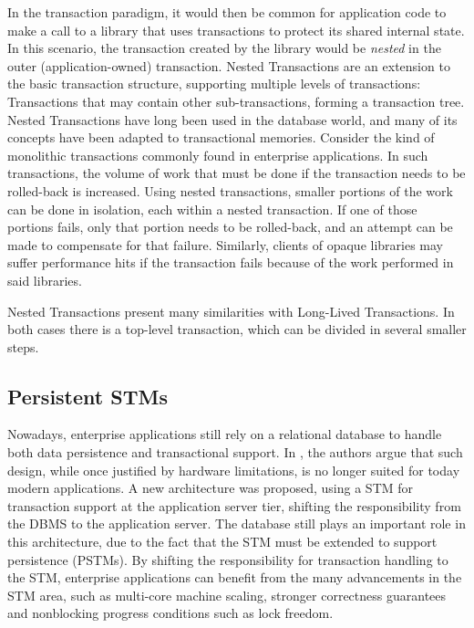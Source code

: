 \documentclass{llncs}
\begin{document}
In the transaction paradigm, it would then be common for application
code to make a call to a library that uses transactions to protect its
shared internal state. In this scenario, the transaction created by
the library would be {\it nested} in the outer (application-owned)
transaction. Nested Transactions are an extension to the basic
transaction structure, supporting multiple levels of transactions:
Transactions that may contain other sub-transactions, forming a
transaction tree. Nested Transactions have long been used in the
database world, and many of its concepts have been adapted to
transactional memories. Consider the kind of monolithic transactions
commonly found in enterprise applications. In such transactions, the
volume of work that must be done if the transaction needs to be
rolled-back is increased. Using nested transactions, smaller portions
of the work can be done in isolation, each within a nested
transaction. If one of those portions fails, only that portion needs
to be rolled-back, and an attempt can be made to compensate for that
failure. Similarly, clients of opaque libraries may suffer performance
hits if the transaction fails because of the work performed in said
libraries.

Nested Transactions present many similarities with Long-Lived
Transactions. In both cases there is a top-level transaction, which
can be divided in several smaller steps.

\subsection{Persistent STMs}
\label{sec:pstm}

Nowadays, enterprise applications still rely on a relational database
to handle both data persistence and transactional support. In
\cite{fernandes2011strict}, the authors argue that such design, while
once justified by hardware limitations, is no longer suited for today
modern applications. A new architecture was proposed, using a STM for
transaction support at the application server tier, shifting the
responsibility from the DBMS to the application server. The database
still plays an important role in this architecture, due to the fact
that the STM must be extended to support persistence (PSTMs).  By
shifting the responsibility for transaction handling to the STM,
enterprise applications can benefit from the many advancements in the
STM area, such as multi-core machine scaling, stronger correctness
guarantees and nonblocking progress conditions such as lock freedom.
\end{document}
